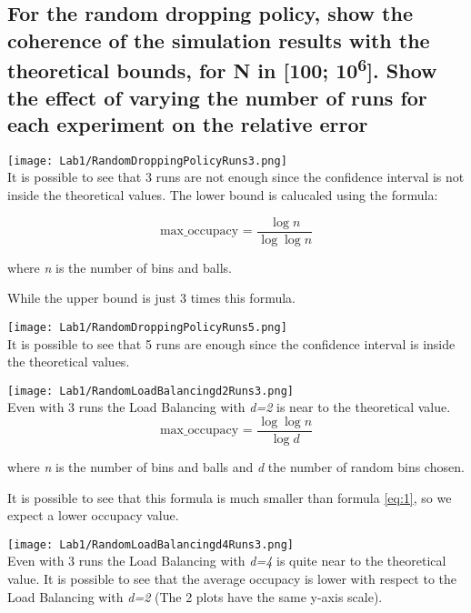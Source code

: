\documentclass{report}
\begin{document}
{			\subsection{For the random dropping policy, show the coherence of the simulation results with the theoretical bounds, for N in [100; 10\textsuperscript{6}]. Show the effect of varying the number of runs for each experiment on the relative error}
			
			\texttt{[image: Lab1/RandomDroppingPolicyRuns3.png]} \\
			It is possible to see that 3 runs are not enough since the confidence interval is not inside the theoretical values.
			The lower bound is calucaled using the formula:
			
			\begin{equation} \label{eq:1}
				 \text{max\_occupacy = }\frac{\log n}{\log \log n} 
			\end{equation}
			\begin{center}
					where \emph{n} is the number of bins and balls.
			\end{center}
			While the upper bound is just 3 times this formula.
			
			\texttt{[image: Lab1/RandomDroppingPolicyRuns5.png]} \\
			It is possible to see that 5 runs are enough since the confidence interval is inside the theoretical values.
			
			\vspace{20px}
			
			\texttt{[image: Lab1/RandomLoadBalancingd2Runs3.png]} \\
			Even with 3 runs the Load Balancing with \emph{d=2} is near to the theoretical value.
			\begin{equation} \label{eq:2}
				 \text{max\_occupacy = }\frac{\log \log n}{\log d}
			\end{equation}
			\begin{center}
					where \emph{n} is the number of bins and balls and \emph{d} the number of random bins chosen.
			\end{center}
			It is possible to see that this formula is much smaller than formula \ref{eq:1}, so we expect a lower occupacy value.
			
			\vspace{20px}
			
			\texttt{[image: Lab1/RandomLoadBalancingd4Runs3.png]} \\
			Even with 3 runs the Load Balancing with \emph{d=4} is quite near to the theoretical value. 
			It is possible to see that the average occupacy is lower with respect to the Load Balancing with \emph{d=2} (The 2 plots have the same y-axis scale).
			
}
\end{document}
